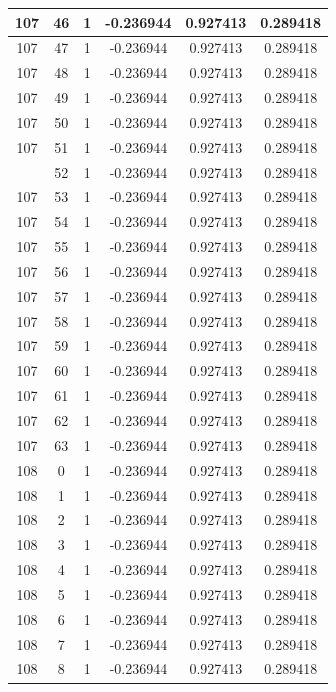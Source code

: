 \documentclass[12pt,a4paper]{article}
\numberwithin{equation}{section}
\numberwithin{figure}{section}
\numberwithin{table}{section}
\begin{document}
\begin{longtable}{|c|c|c|c|c|c|}
107 & 46 & 1 & -0.236944 & 0.927413 & 0.289418 \\ \hline
107 & 47 & 1 & -0.236944 & 0.927413 & 0.289418 \\ \hline
107 & 48 & 1 & -0.236944 & 0.927413 & 0.289418 \\ \hline
107 & 49 & 1 & -0.236944 & 0.927413 & 0.289418 \\ \hline
107 & 50 & 1 & -0.236944 & 0.927413 & 0.289418 \\ \hline
107 & 51 & 1 & -0.236944 & 0.927413 & 0.289418 \\ \hline
\pagebreak
107 & 52 & 1 & -0.236944 & 0.927413 & 0.289418 \\ \hline
107 & 53 & 1 & -0.236944 & 0.927413 & 0.289418 \\ \hline
107 & 54 & 1 & -0.236944 & 0.927413 & 0.289418 \\ \hline
107 & 55 & 1 & -0.236944 & 0.927413 & 0.289418 \\ \hline
107 & 56 & 1 & -0.236944 & 0.927413 & 0.289418 \\ \hline
107 & 57 & 1 & -0.236944 & 0.927413 & 0.289418 \\ \hline
107 & 58 & 1 & -0.236944 & 0.927413 & 0.289418 \\ \hline
107 & 59 & 1 & -0.236944 & 0.927413 & 0.289418 \\ \hline
107 & 60 & 1 & -0.236944 & 0.927413 & 0.289418 \\ \hline
107 & 61 & 1 & -0.236944 & 0.927413 & 0.289418 \\ \hline
107 & 62 & 1 & -0.236944 & 0.927413 & 0.289418 \\ \hline
107 & 63 & 1 & -0.236944 & 0.927413 & 0.289418 \\ \hline
108 & 0 & 1 & -0.236944 & 0.927413 & 0.289418 \\ \hline
108 & 1 & 1 & -0.236944 & 0.927413 & 0.289418 \\ \hline
108 & 2 & 1 & -0.236944 & 0.927413 & 0.289418 \\ \hline
108 & 3 & 1 & -0.236944 & 0.927413 & 0.289418 \\ \hline
108 & 4 & 1 & -0.236944 & 0.927413 & 0.289418 \\ \hline
108 & 5 & 1 & -0.236944 & 0.927413 & 0.289418 \\ \hline
108 & 6 & 1 & -0.236944 & 0.927413 & 0.289418 \\ \hline
108 & 7 & 1 & -0.236944 & 0.927413 & 0.289418 \\ \hline
108 & 8 & 1 & -0.236944 & 0.927413 & 0.289418 \\ \hline

\end{longtable}
\end{document}
